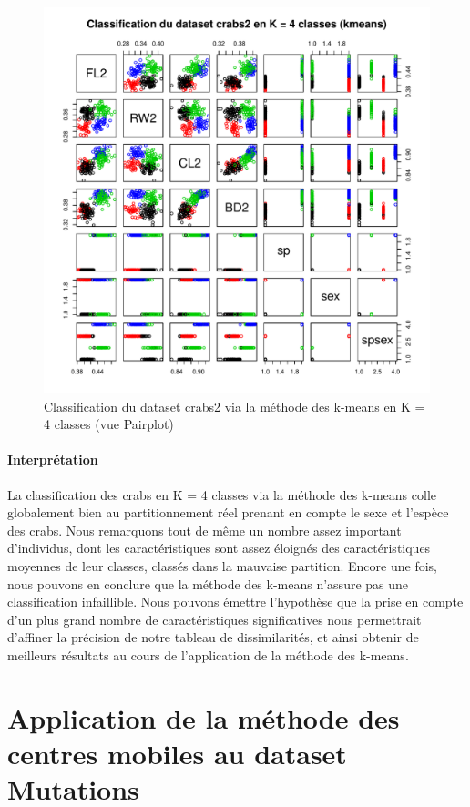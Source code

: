 \documentclass{report}
\begin{document}
\begin{figure}[ht!]
\begin{center}
    \includegraphics[width=\textwidth]{../plots/E3Q6_1.pdf}
    \caption{Classification du dataset crabs2 via la méthode des k-means en K = 4 classes (vue Pairplot)}
\end{center}
\newpage
\end{figure}
\paragraph{Interprétation}
La classification des crabs en K = 4 classes via la méthode des k-means colle globalement bien au partitionnement réel prenant en compte le sexe et l'espèce des crabs. Nous remarquons tout de même un nombre assez important d'individus, dont les caractéristiques sont assez éloignés des caractéristiques moyennes de leur classes, classés dans la mauvaise partition. Encore une fois, nous pouvons en conclure que la méthode des k-means n'assure pas une classification infaillible. Nous pouvons émettre l'hypothèse que la prise en compte d'un plus grand nombre de caractéristiques significatives nous permettrait d'affiner la précision de notre tableau de dissimilarités, et ainsi obtenir de meilleurs résultats au cours de l'application de la méthode des k-means.
\newpage
\section{Application de la méthode des centres mobiles au dataset Mutations}
\end{document}
